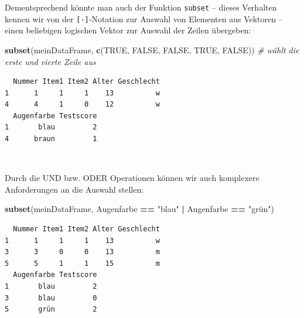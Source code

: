 \documentclass[12pt,]{tufte-book}
\newenvironment{Shaded}{\begin{snugshade}}{\end{snugshade}}
\newcommand{\KeywordTok}[1]{\textcolor[rgb]{0.13,0.29,0.53}{\textbf{#1}}}
\newcommand{\StringTok}[1]{\textcolor[rgb]{0.31,0.60,0.02}{#1}}
\newcommand{\CommentTok}[1]{\textcolor[rgb]{0.56,0.35,0.01}{\textit{#1}}}
\newcommand{\OtherTok}[1]{\textcolor[rgb]{0.56,0.35,0.01}{#1}}
\newcommand{\OperatorTok}[1]{\textcolor[rgb]{0.81,0.36,0.00}{\textbf{#1}}}
\newcommand{\NormalTok}[1]{#1}
\theoremstyle{definition}
\theoremstyle{definition}
\theoremstyle{definition}
\theoremstyle{remark}
\begin{document}
\begin{Shaded}
\end{Shaded}

Dementsprechend könnte man auch der Funktion \texttt{subset} -- dieses
Verhalten kennen wir von der \texttt{{[}·{]}}-Notation zur Auswahl von
Elementen aus Vektoren -- einen beliebigen logischen Vektor zur Auswahl
der Zeilen übergeben:

\begin{Shaded}
\begin{Highlighting}[]
\KeywordTok{subset}\NormalTok{(meinDataFrame, }\KeywordTok{c}\NormalTok{(}\OtherTok{TRUE}\NormalTok{, }\OtherTok{FALSE}\NormalTok{, }\OtherTok{FALSE}\NormalTok{, }\OtherTok{TRUE}\NormalTok{, }
    \OtherTok{FALSE}\NormalTok{))  }\CommentTok{# wählt die erste und vierte Zeile aus}
\end{Highlighting}
\end{Shaded}

\begin{verbatim}
  Nummer Item1 Item2 Alter Geschlecht
1      1     1     1    13          w
4      4     1     0    12          w
  Augenfarbe Testscore
1       blau         2
4      braun         1
\end{verbatim}

~

Durch die UND bzw. ODER Operationen können wir auch komplexere
Anforderungen an die Auswahl stellen:

\begin{Shaded}
\begin{Highlighting}[]
\KeywordTok{subset}\NormalTok{(meinDataFrame, Augenfarbe }\OperatorTok{==}\StringTok{ "blau"} \OperatorTok{|}\StringTok{ }\NormalTok{Augenfarbe }\OperatorTok{==}\StringTok{ }
\StringTok{    "grün")}
\end{Highlighting}
\end{Shaded}

\begin{verbatim}
  Nummer Item1 Item2 Alter Geschlecht
1      1     1     1    13          w
3      3     0     0    13          m
5      5     1     1    15          m
  Augenfarbe Testscore
1       blau         2
3       blau         0
5       grün         2
\end{verbatim}
\end{document}
